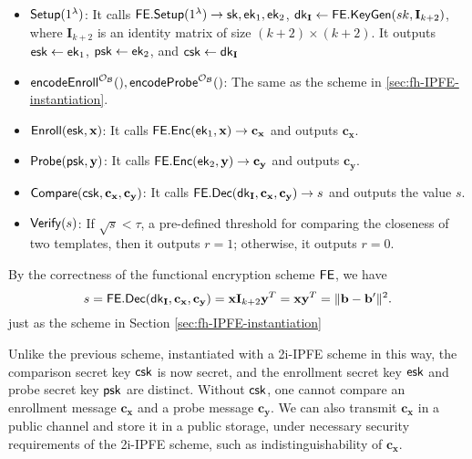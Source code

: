 \begin{itemize}

	\item ${\sf Setup}(1^\lambda)$: It calls ${\sf FE.Setup}(1^\lambda) \to {\sf sk}, {\sf ek}_1, {\sf ek}_2$, $ {\sf dk}_{\mathbf{I}} \gets {\sf FE.KeyGen}(sk, \mathbf{I}_{k+2})$, where $\mathbf{I}_{k+2}$ is an identity matrix of size $(k+2) \times (k+2)$. It outputs ${\sf esk} \gets {\sf ek}_1$, ${\sf psk} \gets {\sf ek}_2$, and ${\sf csk} \gets {\sf dk}_{\mathbf{I}}$

	\item ${\sf encodeEnroll}^{\mathcal{O}_{\mathcal{B}}}(), {\sf encodeProbe}^{\mathcal{O}_{\mathcal{B}}}()$: The same as the scheme in \ref{sec:fh-IPFE-instantiation}. 

	\item ${\sf Enroll}({\sf esk}, \mathbf{x})$: It calls ${\sf FE.Enc}({\sf ek}_1, \mathbf{x}) \to \mathbf{c_x}$ and outputs $\mathbf{c_x}$.

	\item ${\sf Probe}({\sf psk}, \mathbf{y})$: It calls ${\sf FE.Enc}({\sf ek}_2, \mathbf{y}) \to \mathbf{c_y}$ and outputs $\mathbf{c_y}$.

	\item ${\sf Compare}({\sf csk}, \mathbf{c_x}, \mathbf{c_y)}$: It calls ${\sf FE.Dec}({\sf dk}_{\mathbf{I}}, \mathbf{c_x}, \mathbf{c_y}) \to s$ and outputs the value $s$.

	\item ${\sf Verify}(s)$: If $\sqrt{s} < \tau$, a pre-defined threshold for comparing the closeness of two templates, then it outputs $r = 1$; otherwise, it outputs $r = 0$.

\end{itemize}

By the correctness of the functional encryption scheme $\sf FE$, we have
\[
	s = {\sf FE.Dec}({\sf dk}_{\mathbf{I}}, \mathbf{c_x}, \mathbf{c_y}) =  \mathbf{x} \mathbf{I}_{k+2} \mathbf{y}^T = \mathbf{x} \mathbf{y}^T = \| \mathbf{b} - \mathbf{b'} \|^2.
\]
just as the scheme in Section \ref{sec:fh-IPFE-instantiation}


Unlike the previous scheme, instantiated with a 2i-IPFE scheme in this way, the comparison secret key ${\sf csk}$ is now secret, and the enrollment secret key ${\sf esk}$ and probe secret key ${\sf psk}$ are distinct. Without ${\sf csk}$, one cannot compare an enrollment message $\mathbf{c_x}$ and a probe message $\mathbf{c_y}$. We can also transmit $\mathbf{c_x}$ in a public channel and store it in a public storage, under necessary security requirements of the 2i-IPFE scheme, such as indistinguishability of $\mathbf{c_x}$.

